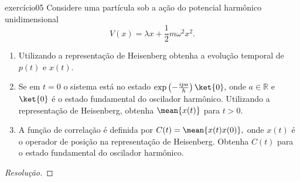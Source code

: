 \begin{exercício}{}{exercício05}
    Considere uma partícula sob a ação do potencial harmônico unidimensional
    \begin{equation*}
        V(x) = \lambda x + \frac12 m \omega^2 x^2.
    \end{equation*}
    \begin{enumerate}[label=(\alph*)]
        \item Utilizando a representação de Heisenberg obtenha a evolução temporal de \(p(t)\) e \(x(t)\).
        \item Se em \(t = 0\) o sistema está no estado \(\exp\left(-\frac{ipa}{\hbar}\right)\ket{0},\) onde \(a \in \mathbb{R}\) e \(\ket{0}\) é o estado fundamental do oscilador harmônico. Utilizando a representação de Heisenberg, obtenha \(\mean{x(t)}\) para \(t > 0\).
        \item A função de correlação é definida por \(C(t) = \mean{x(t)x(0)},\) onde \(x(t)\) é o operador de posição na representação de Heisenberg. Obtenha \(C(t)\) para o estado fundamental do oscilador harmônico.
    \end{enumerate}
\end{exercício}
\begin{proof}[Resolução]
    
\end{proof}
